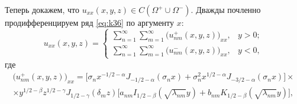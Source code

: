 	
Теперь докажем, что $u_{xx}(x,y,z)\in C(\Omega^+\cup\Omega^-).$ Дважды почленно продифференцируем ряд \eqref{eq:k36} по аргументу $x$:
\begin{equation}
u_{xx}(x,y,z) %
=\left\{ \begin{array}{ll}
\sum\limits_{n=1}^\infty\sum\limits_{m=1}^\infty
\bigl( u^+_{nm}(x,y,z)\bigr)_{xx} , &y > 0; 
\\[3mm]
\sum\limits_{n=1}^\infty 
\sum\limits_{m=1}^\infty 
\bigl( u^-_{nm}(x,y,z)\bigr)_{xx} , & y < 0,
 \end{array} \right. 
\label{eq:k62}
\end{equation}
где 
\begin{multline}
\bigl( u^+_{nm}(x,y,z)\bigr)_{xx} =
\bigl[\sigma_n x^{- 1/2 -\alpha}J_{- 1/2 -\alpha}(\sigma_n x)+\sigma_n^2 x^{ 1/2 -\alpha}J_{-3/2-\alpha}(\sigma_n x)\bigr] \times \\
\times  y^{ 1/2 -\beta}z^{ 1/2 -\gamma} J_{ 1/2 -\gamma}(\delta_m z) 
\bigl[a_{nm}I_{ 1/2 -\beta}(\sqrt{\lambda_{nm}}y)+b_{nm}K_{ 1/2 -\beta}(\sqrt{\lambda_{nm}}y)\bigr],
\end{multline}
